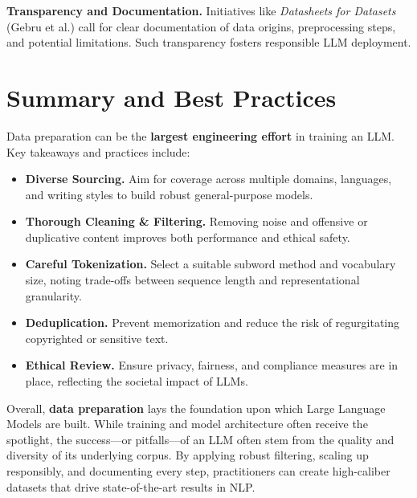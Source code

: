 \noindent
\textbf{Transparency and Documentation.}  
Initiatives like \emph{Datasheets for Datasets} (Gebru et al.) call for clear documentation of data origins, preprocessing steps, and potential limitations. Such transparency fosters responsible LLM deployment.

\section{Summary and Best Practices}
\noindent
Data preparation can be the \textbf{largest engineering effort} in training an LLM. Key takeaways and practices include:
\begin{itemize}
    \item \textbf{Diverse Sourcing.} Aim for coverage across multiple domains, languages, and writing styles to build robust general-purpose models.
    \item \textbf{Thorough Cleaning \& Filtering.} Removing noise and offensive or duplicative content improves both performance and ethical safety.
    \item \textbf{Careful Tokenization.} Select a suitable subword method and vocabulary size, noting trade-offs between sequence length and representational granularity.
    \item \textbf{Deduplication.} Prevent memorization and reduce the risk of regurgitating copyrighted or sensitive text.
    \item \textbf{Ethical Review.} Ensure privacy, fairness, and compliance measures are in place, reflecting the societal impact of LLMs.
\end{itemize}

\bigskip
\noindent
Overall, \textbf{data preparation} lays the foundation upon which Large Language Models are built. While training and model architecture often receive the spotlight, the success—or pitfalls—of an LLM often stem from the quality and diversity of its underlying corpus. By applying robust filtering, scaling up responsibly, and documenting every step, practitioners can create high-caliber datasets that drive state-of-the-art results in NLP. 
